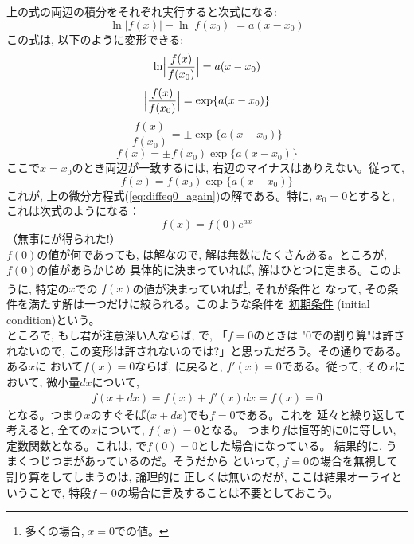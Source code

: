上の式の両辺の積分をそれぞれ実行すると次式になる:
\begin{equation}\ln |f(x)| - \ln |f(x_0)| = a (x-x_0)\end{equation}
この式は, 以下のように変形できる:
\begin{equation}\ln \Bigl|\frac{f(x)}{f(x_0)}\Bigr| = a (x-x_0)\end{equation}
\begin{equation}\Bigl|\frac{f(x)}{f(x_0)}\Bigr| = \exp\{a (x-x_0)\}\end{equation}
\begin{equation}\frac{f(x)}{f(x_0)} = \pm \exp\{a (x-x_0)\}\end{equation}
\begin{equation}f(x) = \pm f(x_0)\exp\{a (x-x_0)\}\end{equation}
ここで$x=x_0$のとき両辺が一致するには, 右辺のマイナスはありえない。従って, 
\begin{equation}
f(x)=f(x_0) \exp\{a(x-x_0)\}\label{eq:difex3solx0}
\end{equation}
これが, 上の微分方程式(\ref{eq:diffeq0_again})の解である。特に, $x_0=0$とすると, 
これは次式のようになる：
\begin{equation}f(x)=f(0) e^{a x}\label{eq:difex3sol}\end{equation}
（無事にが得られた!）\\

$f(0)$の値が何であっても, は解なので, 
解は無数にたくさんある。ところが, $f(0)$の値があらかじめ
具体的に決まっていれば, 解はひとつに定まる。このように, 特定の$x$での
$f(x)$の値が決まっていれば\footnote{多くの場合, $x=0$での値。}, それが条件と
なって, その条件を満たす解は一つだけに絞られる。このような条件を
\underline{初期条件} (initial condition)という。\\

ところで, もし君が注意深い人ならば, で, 「$f=0$のときは
"0での割り算"は許されないので, この変形は許されないのでは?」と思っただろう。その通りである。ある$x$に
おいて$f(x)=0$ならば, に戻ると, $f'(x)=0$である。従って, 
その$x$において, 微小量$dx$について, 
\begin{eqnarray}
f(x+dx)=f(x)+f'(x)dx=f(x)=0
\end{eqnarray}
となる。つまり$x$のすぐそば($x+dx$)でも$f=0$である。これを
延々と繰り返して考えると, 全ての$x$について, $f(x)=0$となる。
つまり$f$は恒等的に0に等しい, 定数関数となる。これは, 
で$f(0)=0$とした場合になっている。
結果的に, うまくつじつまがあっているのだ。そうだから
といって, $f=0$の場合を無視して割り算をしてしまうのは, 論理的に
正しくは無いのだが, ここは結果オーライということで, 
特段$f=0$の場合に言及することは不要としておこう。\\

